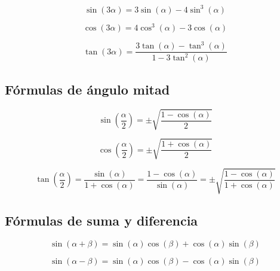 \begin{proposición}
$$\sin(3\alpha) = 3\sin(\alpha) - 4\sin^3(\alpha)$$
\end{proposición}

\begin{proposición}
$$\cos(3\alpha) = 4\cos^3(\alpha) - 3\cos(\alpha)$$
\end{proposición}

\begin{proposición}
$$\tan(3\alpha) = \frac{3\tan(\alpha) - \tan^3(\alpha)}{1 - 3\tan^2(\alpha)}$$
\end{proposición}

\subsection{Fórmulas de ángulo mitad}

\begin{proposición}
$$\sin\left(\frac{\alpha}{2}\right) = \pm\sqrt{\frac{1 - \cos(\alpha)}{2}}$$
\end{proposición}

\begin{proposición}
$$\cos\left(\frac{\alpha}{2}\right) = \pm\sqrt{\frac{1 + \cos(\alpha)}{2}}$$
\end{proposición}

\begin{proposición}
$$\tan\left(\frac{\alpha}{2}\right) = \frac{\sin(\alpha)}{1 + \cos(\alpha)} = \frac{1 - \cos(\alpha)}{\sin(\alpha)} = \pm\sqrt{\frac{1 - \cos(\alpha)}{1 + \cos(\alpha)}}$$
\end{proposición}

\subsection{Fórmulas de suma y diferencia}

\begin{proposición}
$$\sin(\alpha + \beta) = \sin(\alpha)\cos(\beta) + \cos(\alpha)\sin(\beta)$$
\end{proposición}

\begin{proposición}
$$\sin(\alpha - \beta) = \sin(\alpha)\cos(\beta) - \cos(\alpha)\sin(\beta)$$
\end{proposición}

